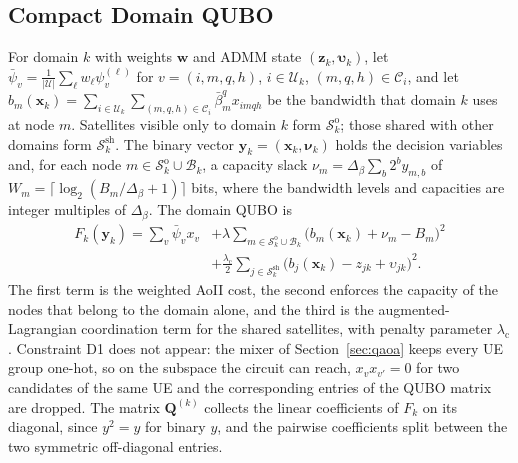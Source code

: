 \subsection{Compact Domain QUBO}
\label{sec:compact_qubo}

For domain $k$ with weights $\mathbf{w}$ and ADMM state $(\mathbf{z}_k,\boldsymbol{\upsilon}_k)$, let
$\bar\psi_v=\frac{1}{|\mathscr{U}|}\sum_\ell w_\ell\psi^{(\ell)}_v$ for $v=(i,m,q,h)$, $i\in\mathscr{U}_k$,
$(m,q,h)\in\mathscr{C}_i$, and let $b_m(\mathbf{x}_k)=\sum_{i\in\mathscr{U}_k}\sum_{(m,q,h)\in\mathscr{C}_i}
\bar\beta^q_m x_{imqh}$ be the bandwidth that domain $k$ uses at node $m$. Satellites visible only to domain $k$ form
$\mathscr{S}^{\mathrm{o}}_k$; those shared with other domains form $\mathscr{S}^{\mathrm{sh}}_k$. The binary vector
$\mathbf{y}_k=(\mathbf{x}_k,\boldsymbol{\nu}_k)$ holds the decision variables and, for each node
$m\in\mathscr{S}^{\mathrm{o}}_k\cup\mathscr{B}_k$, a capacity slack $\nu_m=\Delta_\beta\sum_{b}2^b y_{m,b}$ of
$W_m=\lceil\log_2(B_m/\Delta_\beta+1)\rceil$ bits, where the bandwidth levels and capacities are integer multiples of
$\Delta_\beta$. The domain QUBO is
\begin{align}
    F_k(\mathbf{y}_k)=\sum_{v}\bar\psi_v x_v
    &+\lambda\!\!\sum_{m\in\mathscr{S}^{\mathrm{o}}_k\cup\mathscr{B}_k}\!\!\bigl(b_m(\mathbf{x}_k)+\nu_m-B_m\bigr)^2
    \nonumber\\
    &+\frac{\lambda_{\mathrm{c}}}{2}\sum_{j\in\mathscr{S}^{\mathrm{sh}}_k}\bigl(b_j(\mathbf{x}_k)-z_{jk}+\upsilon_{jk}\bigr)^2 .
    \label{eq:Fk_compact}
\end{align}
The first term is the weighted AoII cost, the second enforces the capacity of the nodes that belong to the domain
alone, and the third is the augmented-Lagrangian coordination term for the shared satellites, with penalty parameter
$\lambda_{\mathrm{c}}$. Constraint D1 does not appear: the mixer of Section~\ref{sec:qaoa} keeps every UE group one-hot, so on the subspace
the circuit can reach, $x_vx_{v'}=0$ for two candidates of the same UE and the corresponding entries of the QUBO
matrix are dropped. The matrix $\mathbf{Q}^{(k)}$ collects the linear coefficients of $F_k$ on its diagonal, since
$y^2=y$ for binary $y$, and the pairwise coefficients split between the two symmetric off-diagonal entries.

